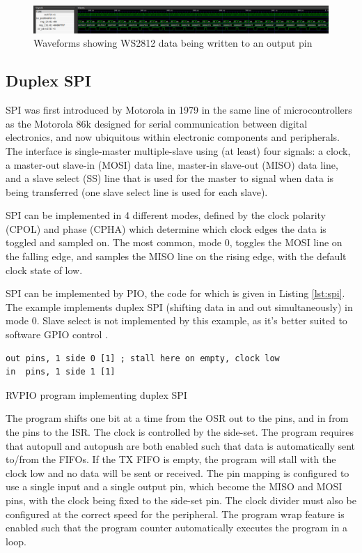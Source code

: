 \begin{figure}[H]
    \centering
    \includegraphics[width=\textwidth]{../img/ws2812-2.png}
    \caption{Waveforms showing WS2812 data being written to an output pin}
    \label{fig:ws2812-2}
\end{figure}

\subsection{Duplex SPI}
\label{sec:spi}

SPI was first introduced by Motorola in 1979 in the same line of microcontrollers as the Motorola 86k designed for serial communication between digital electronics, and now ubiquitous within electronic components and peripherals. The interface is single-master multiple-slave using (at least) four signals: a clock, a master-out slave-in (MOSI) data line, master-in slave-out (MISO) data line, and a slave select (SS) line that is used for the master to signal when data is being transferred (one slave select line is used for each slave).

SPI can be implemented in 4 different modes, defined by the clock polarity (CPOL) and phase (CPHA) which determine which clock edges the data is toggled and sampled on. The most common, mode 0, toggles the MOSI line on the falling edge, and samples the MISO line on the rising edge, with the default clock state of low.

SPI can be implemented by PIO, the code for which is given in Listing \ref{lst:spi}. The example implements duplex SPI (shifting data in and out simultaneously) in mode 0. Slave select is not implemented by this example, as it's better suited to software GPIO control \cite{rp2040}.

\begin{listing}[h!]
    \begin{verbatim}
out pins, 1 side 0 [1] ; stall here on empty, clock low
in  pins, 1 side 1 [1] 
    \end{verbatim}
    \caption{RVPIO program implementing duplex SPI \cite{rp2040}}
    \label{lst:spi}
\end{listing}

The program shifts one bit at a time from the OSR out to the pins, and in from the pins to the ISR. The clock is controlled by the side-set. The program requires that autopull and autopush are both enabled such that data is automatically sent to/from the FIFOs. If the TX FIFO is empty, the program will stall with the clock low and no data will be sent or received. The pin mapping is configured to use a single input and a single output pin, which become the MISO and MOSI pins, with the clock being fixed to the side-set pin. The clock divider must also be configured at the correct speed for the peripheral. The program wrap feature is enabled such that the program counter automatically executes the program in a loop.

